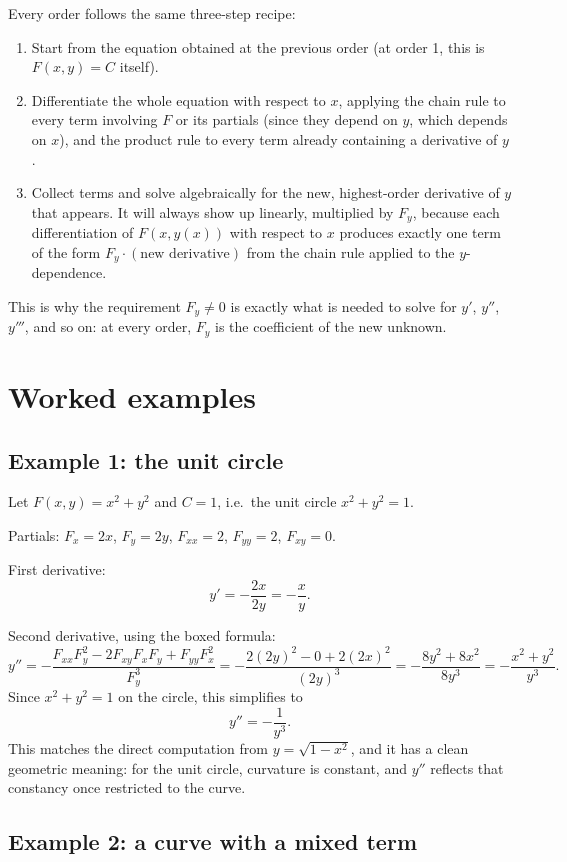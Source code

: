 \documentclass{essay}
\begin{document}
Every order follows the same three-step recipe:
\begin{enumerate}[label=(\arabic*)]
\item Start from the equation obtained at the previous order (at order 1, this is
$F(x,y) = C$ itself).
\item Differentiate the whole equation with respect to $x$, applying the chain rule to every
term involving $F$ or its partials (since they depend on $y$, which depends on $x$), and the
product rule to every term already containing a derivative of $y$.
\item Collect terms and solve algebraically for the new, highest-order derivative of $y$
that appears. It will always show up linearly, multiplied by $F_y$, because each
differentiation of $F(x, y(x))$ with respect to $x$ produces exactly one term of the form
$F_y \cdot (\text{new derivative})$ from the chain rule applied to the $y$-dependence.
\end{enumerate}
This is why the requirement $F_y \neq 0$ is exactly what is needed to solve for $y'$, $y''$,
$y'''$, and so on: at every order, $F_y$ is the coefficient of the new unknown.

\section{Worked examples}

\subsection*{Example 1: the unit circle}

Let $F(x,y) = x^2 + y^2$ and $C = 1$, i.e.\ the unit circle $x^2 + y^2 = 1$.

Partials: $F_x = 2x$, $F_y = 2y$, $F_{xx} = 2$, $F_{yy} = 2$, $F_{xy} = 0$.

First derivative:
\[
y' = -\frac{2x}{2y} = -\frac{x}{y}.
\]

Second derivative, using the boxed formula:
\[
y'' = -\frac{F_{xx}F_y^2 - 2F_{xy}F_xF_y + F_{yy}F_x^2}{F_y^3}
= -\frac{2(2y)^2 - 0 + 2(2x)^2}{(2y)^3}
= -\frac{8y^2 + 8x^2}{8y^3}
= -\frac{x^2+y^2}{y^3}.
\]
Since $x^2 + y^2 = 1$ on the circle, this simplifies to
\[
y'' = -\frac{1}{y^3}.
\]
This matches the direct computation from $y = \sqrt{1-x^2}$, and it has a clean geometric
meaning: for the unit circle, curvature is constant, and $y''$ reflects that constancy once
restricted to the curve.

\subsection*{Example 2: a curve with a mixed term}
\end{document}

